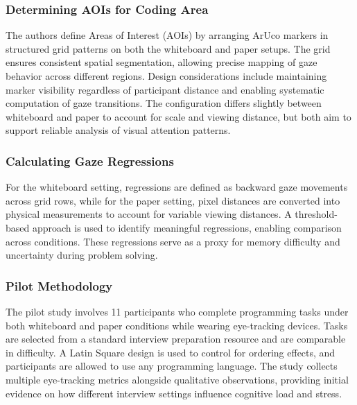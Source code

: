 \subsubsection{Determining AOIs for Coding Area}
The authors define Areas of Interest (AOIs) by arranging ArUco markers in structured grid patterns on both the whiteboard and paper setups. The grid ensures consistent spatial segmentation, allowing precise mapping of gaze behavior across different regions. Design considerations include maintaining marker visibility regardless of participant distance and enabling systematic computation of gaze transitions. The configuration differs slightly between whiteboard and paper to account for scale and viewing distance, but both aim to support reliable analysis of visual attention patterns.

\subsubsection{Calculating Gaze Regressions}
For the whiteboard setting, regressions are defined as backward gaze movements across grid rows, while for the paper setting, pixel distances are converted into physical measurements to account for variable viewing distances. A threshold-based approach is used to identify meaningful regressions, enabling comparison across conditions. These regressions serve as a proxy for memory difficulty and uncertainty during problem solving.

\subsubsection{Pilot Methodology}
The pilot study involves 11 participants who complete programming tasks under both whiteboard and paper conditions while wearing eye-tracking devices. Tasks are selected from a standard interview preparation resource and are comparable in difficulty. A Latin Square design is used to control for ordering effects, and participants are allowed to use any programming language. The study collects multiple eye-tracking metrics alongside qualitative observations, providing initial evidence on how different interview settings influence cognitive load and stress.